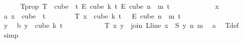 \begin{isabellebody}
\ \ \ \ \isamarkupfalse%
\ T{\isacharprime}{\kern0pt}{\isacharunderscore}{\kern0pt}prop{\isacharcolon}{\kern0pt}\ {\isachardoublequoteopen}T{\isacharprime}{\kern0pt}\ {\isasymin}\ cube\ {}\ {\isacharparenleft}{\kern0pt}t{\isacharplus}{\kern0pt}{}{\isacharparenright}{\kern0pt}\ {\isasymrightarrow}\isactrlsub E\ cube\ k\ {\isacharparenleft}{\kern0pt}t{\isacharplus}{\kern0pt}{}{\isacharparenright}{\kern0pt}\ {\isasymrightarrow}\isactrlsub E\ cube\ {\isacharparenleft}{\kern0pt}n\ {\isacharplus}{\kern0pt}\ m{\isacharparenright}{\kern0pt}\ {\isacharparenleft}{\kern0pt}t{\isacharplus}{\kern0pt}{}{\isacharparenright}{\kern0pt}{\isachardoublequoteclose}\isanewline
\ \ \ \ \isamarkupfalse%
\isanewline
\ \ \ \ \ \ \isamarkupfalse%
\ x\ \isamarkupfalse%
\ a{\isacharcolon}{\kern0pt}\ {\isachardoublequoteopen}x\ {\isasymin}\ cube\ {}\ {\isacharparenleft}{\kern0pt}t{\isacharplus}{\kern0pt}{}{\isacharparenright}{\kern0pt}{\isachardoublequoteclose}\isanewline
\ \ \ \ \ \ \isamarkupfalse%
\ {\isachardoublequoteopen}T{\isacharprime}{\kern0pt}\ x\ {\isasymin}\ cube\ k\ {\isacharparenleft}{\kern0pt}t\ {\isacharplus}{\kern0pt}\ {}{\isacharparenright}{\kern0pt}\ {\isasymrightarrow}\isactrlsub E\ cube\ {\isacharparenleft}{\kern0pt}n\ {\isacharplus}{\kern0pt}\ m{\isacharparenright}{\kern0pt}\ {\isacharparenleft}{\kern0pt}t\ {\isacharplus}{\kern0pt}\ {}{\isacharparenright}{\kern0pt}{\isachardoublequoteclose}\isanewline
\ \ \ \ \ \ \isamarkupfalse%
\isanewline
\ \ \ \ \ \ \ \ \isamarkupfalse%
\ y\ \isamarkupfalse%
\ b{\isacharcolon}{\kern0pt}\ {\isachardoublequoteopen}y\ {\isasymin}\ cube\ k\ {\isacharparenleft}{\kern0pt}t{\isacharplus}{\kern0pt}{}{\isacharparenright}{\kern0pt}{\isachardoublequoteclose}\isanewline
\ \ \ \ \ \ \ \ \isamarkupfalse%
\ \isamarkupfalse%
\ {\isachardoublequoteopen}T{\isacharprime}{\kern0pt}\ x\ y\ {\isacharequal}{\kern0pt}\ join\ {\isacharparenleft}{\kern0pt}L{\isacharunderscore}{\kern0pt}line\ {\isacharparenleft}{\kern0pt}x\ {}{\isacharparenright}{\kern0pt}{\isacharparenright}{\kern0pt}\ {\isacharparenleft}{\kern0pt}S\ y{\isacharparenright}{\kern0pt}\ n\ m{\isachardoublequoteclose}\ \isamarkupfalse%
\ a\ \isamarkupfalse%
\ T{\isacharprime}{\kern0pt}{\isacharunderscore}{\kern0pt}def\ \isamarkupfalse%
\ simp\isanewline

\end{isabellebody}
